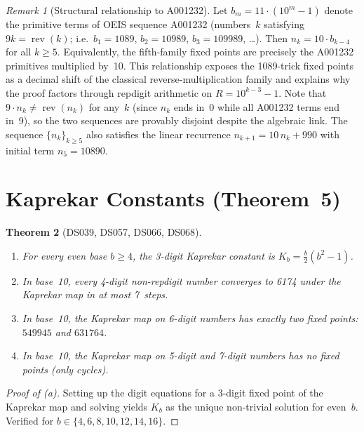\documentclass[11pt,a4paper]{amsart}
\theoremstyle{plain}
\newtheorem{theorem}{Theorem}
\theoremstyle{definition}
\theoremstyle{remark}
\newtheorem{remark}[theorem]{Remark}
\DeclareMathOperator{\rev}{rev}
\begin{document}
\begin{remark}[Structural relationship to A001232]\label{rem:a001232}
Let $b_m = 11 \cdot (10^m - 1)$ denote the primitive terms of
OEIS sequence A001232 (numbers~$k$ satisfying $9k = \rev(k)$;
i.e.\ $b_1 = 1089$, $b_2 = 10989$, $b_3 = 109989$, \ldots).
Then $n_k = 10 \cdot b_{k-4}$ for all $k \geq 5$.
Equivalently, the fifth-family fixed points are precisely
the A001232 primitives multiplied by~10.
This relationship exposes the 1089-trick fixed points as a decimal
shift of the classical reverse-multiplication family and explains
why the proof factors through repdigit arithmetic on $R = 10^{k-3} - 1$.
Note that $9 \cdot n_k \neq \rev(n_k)$ for any~$k$ (since $n_k$ ends
in~0 while all A001232 terms end in~9), so the two sequences are
provably disjoint despite the algebraic link.
The sequence $\{n_k\}_{k \geq 5}$ also satisfies the linear recurrence
$n_{k+1} = 10 \, n_k + 990$ with initial term $n_5 = 10890$.
\end{remark}

\section{Kaprekar Constants (Theorem~5)}\label{sec:kaprekar}

\begin{theorem}[DS039, DS057, DS066, DS068]\label{thm:kaprekar}\hfill
\begin{enumerate}
\item[\textup{(a)}] For every even base $b \geq 4$, the 3-digit Kaprekar
  constant is $K_b = \tfrac{b}{2}(b^2 - 1)$.
\item[\textup{(b)}] In base~10, every 4-digit non-repdigit number converges
  to 6174 under the Kaprekar map in at most 7~steps.
\item[\textup{(c)}] In base~10, the Kaprekar map on 6-digit numbers has
  exactly two fixed points: $549945$ and $631764$.
\item[\textup{(d)}] In base~10, the Kaprekar map on 5-digit and 7-digit
  numbers has \emph{no} fixed points (only cycles).
\end{enumerate}
\end{theorem}

\begin{proof}[Proof of \textup{(a)}]
Setting up the digit equations for a 3-digit fixed point of the Kaprekar map
and solving yields $K_b$ as the unique non-trivial solution for even~$b$.
Verified for $b \in \{4, 6, 8, 10, 12, 14, 16\}$.
\end{proof}
\end{document}
